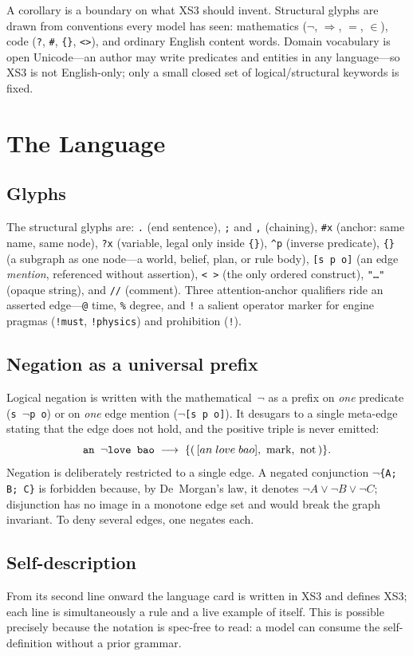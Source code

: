 \documentclass[conference]{IEEEtran}
\newcommand{\code}[1]{\texttt{#1}}
\begin{document}
A corollary is a boundary on what XS3 should invent. Structural glyphs are drawn
from conventions every model has seen: mathematics ($\neg$, $\Rightarrow$,
$=$, $\in$), code (\code{?}, \code{\#}, \code{\{\}}, \code{<>}), and ordinary
English content words. Domain vocabulary is open Unicode---an author may write
predicates and entities in any language---so XS3 is not English-only; only a
small closed set of logical/structural keywords is fixed.

\section{The Language}\label{sec:lang}

\subsection{Glyphs}
The structural glyphs are: \code{.} (end sentence), \code{;} and \code{,}
(chaining), \code{\#x} (anchor: same name, same node), \code{?x} (variable, legal
only inside \code{\{\}}), \code{\^{}p} (inverse predicate), \code{\{\}} (a
subgraph as one node---a world, belief, plan, or rule body), \code{[s p o]}
(an edge \emph{mention}, referenced without assertion), \code{< >} (the only
ordered construct), \code{"\dots"} (opaque string), and \code{//} (comment).
Three attention-anchor qualifiers ride an asserted edge---\code{@} time,
\code{\%} degree, and \code{!} a salient operator marker for engine pragmas
(\code{!must}, \code{!physics}) and prohibition (\code{!}).

\subsection{Negation as a universal prefix}
Logical negation is written with the mathematical~$\neg$ as a prefix on
\emph{one} predicate (\code{s $\neg$p o}) or on \emph{one} edge mention
(\code{$\neg$[s p o]}). It desugars to a single meta-edge stating that the
edge does not hold, and the positive triple is never emitted:
\[
\text{\code{an $\neg$love bao}} \;\longrightarrow\; \{(\,[an\;love\;bao],\ \text{mark},\ \text{not}\,)\}.
\]
Negation is deliberately restricted to a single edge. A negated conjunction
\code{$\neg$\{A; B; C\}} is forbidden because, by De~Morgan's law, it denotes
$\neg A \vee \neg B \vee \neg C$; disjunction has no image in a monotone edge set
and would break the graph invariant. To deny several edges, one negates each.

\subsection{Self-description}
From its second line onward the language card is written in XS3 and defines XS3;
each line is simultaneously a rule and a live example of itself. This is possible
precisely because the notation is spec-free to read: a model can consume the
self-definition without a prior grammar.
\end{document}
